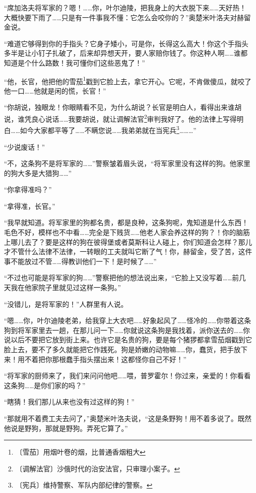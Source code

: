 \documentclass[12pt,UTF-8,openany]{ctexbook}
\begin{document}
\begin{normalsize}
    “席加洛夫将军家的？嗯！……你，叶尔迪陵，把我身上的大衣脱下来……天好热！大概快要下雨了……只是有一件事我不懂：它怎么会咬你的？”奥楚米叶洛夫对赫留金说。
    
    “难道它够得到你的手指头？它身子矮小，可是你，长得这么高大！你这个手指头多半是让小钉子扎破了，后来却异想天开，要人家赔你钱了。你这种人啊……谁都知道是个什么路数！我可懂你们这些恶鬼了！”
    
    “他，长官，他把他的雪茄\footnote{〔雪茄〕用烟叶卷的烟，比普通香烟粗大}戳到它脸上去，拿它开心。它呢，不肯做傻瓜，就咬了他一口……他就是闲的慌，长官！”
    
    “你胡说，独眼龙！你眼睛看不见，为什么胡说？长官是明白人，看得出来谁胡说，谁凭良心说话……我要胡说，就让调解法官\footnote{〔调解法官〕沙俄时代的治安法官，只审理小案子。}审判我好了。他的法律上写得明白……如今大家都平等了……不瞒您说……我弟弟就在当宪兵\footnote{〔宪兵〕维持警察、军队内部纪律的警察。}………”
    
    “少说废话！”
    
    “不，这条狗不是将军家的……”警察皱着眉头说，“将军家里没有这样的狗。他家里的狗大多是大猎狗……”
    
    “你拿得准吗？”
    
    “拿得准，长官。”
    
    “我早就知道。将军家里的狗都名贵，都是良种，这条狗呢，鬼知道是什么东西！毛色不好，模样也不中看……完全是下贱货……他老人家会养这样的狗？！你的脑筋上哪儿去了？要是这样的狗在彼得堡或者莫斯科让人碰上，你们知道会怎样？那儿才不管什么法律不法律，一转眼的工夫就叫它断了气！你，赫留金，受了苦，这件事不能放过不管……得教训他们一下！是时候了……”
    
    “不过也可能是将军家的狗……”警察把他的想法说出来，“它脸上又没写着……前几天我在他家院子里就见过这样一条狗。”
    
    “没错儿，是将军家的！”人群里有人说。
    
    “嗯……你，叶尔迪陵老弟，给我穿上大衣吧……好象起风了……怪冷的……你带着这条狗到将军家里去一趟，在那儿问一下……你就说这条狗是我找着，派你送去的……你说以后不要把它放到街上来。也许它是名贵的狗，要是每个猪猡都拿雪茄烟戳到它脸上去，要不了多久就能把它作践死。狗是娇嫩的动物嘛……你，蠢货，把手放下来！用不着把你那根蠢手指头摆出来！这都怪你自己不好！”
    
    “将军家的厨师来了，我们来问问他吧……喂，普罗霍尔！你过来，亲爱的！你看看这条狗……是你们家的吗？”
    
    “瞎猜！我们那儿从来也没有过这样的狗！”
    
    “那就用不着费工夫去问了，”奥楚米叶洛夫说，“这是条野狗！用不着多说了。既然他说是野狗，那就是野狗。弄死它算了。”
    

\end{normalsize}
\end{document}
